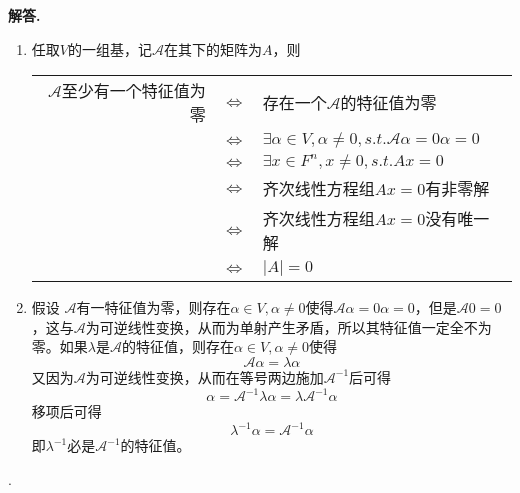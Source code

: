 \documentclass[12pt, a4paper, oneside]{ctexart}
\newenvironment{solution}{\par\noindent\textbf{解答. }}{\\\par}
\begin{document}
\begin{solution}
    \begin{enumerate}
        \item 任取$V$的一组基，记$\mathcal{A}$在其下的矩阵为$A$，则

        \begin{tabular}{rcl}
        $\mathcal{A}$至少有一个特征值为零&$\Leftrightarrow$&存在一个$\mathcal{A}$的特征值为零 \\
        &$\Leftrightarrow$&$\exists\alpha\in V,\alpha\neq 0,s.t.\mathcal{A}\alpha=0\alpha=0$\\
        &$\Leftrightarrow$&$\exists x\in F^n,x\neq 0,s.t.Ax=0$\\
        &$\Leftrightarrow$&齐次线性方程组$Ax=0$有非零解\\
        &$\Leftrightarrow$&齐次线性方程组$Ax=0$没有唯一解\\
        &$\Leftrightarrow$&$\lvert A\rvert=0$\\
        \end{tabular}
        \item 假设 $\mathcal{A}$有一特征值为零，则存在$\alpha\in V,\alpha\neq0$使得$\mathcal{A}\alpha=0\alpha=0$，但是$\mathcal{A}0=0$，这与$\mathcal{A}$为可逆线性变换，从而为单射产生矛盾，所以其特征值一定全不为零。如果$\lambda$是$\mathcal{A}$的特征值，则存在$\alpha\in V,\alpha\neq0$使得
    \[\mathcal{A}\alpha=\lambda\alpha\]
    又因为$\mathcal{A}$为可逆线性变换，从而在等号两边施加$\mathcal{A}^{-1}$后可得
    \[\alpha=\mathcal{A}^{-1}\lambda\alpha=\lambda\mathcal{A}^{-1}\alpha\]
    移项后可得
    \[\lambda^{-1}\alpha=\mathcal{A}^{-1}\alpha\]
    即$\lambda^{-1}$必是$\mathcal{A}^{-1}$的特征值。
    \end{enumerate}
    .
\end{solution}
\end{document}
